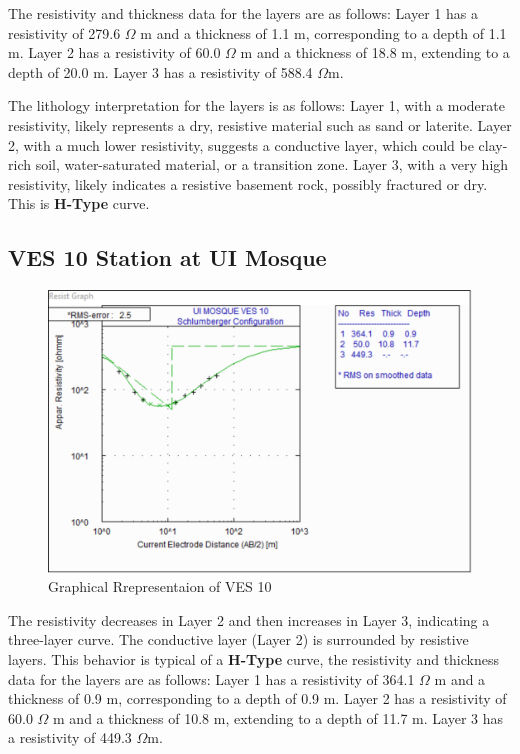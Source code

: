 \documentclass[12pt,a4paper]{report}
\begin{document}
The resistivity and thickness data for the layers are as follows: Layer 1 has a resistivity of 279.6 $\Omega$ m and a thickness of 1.1 m, corresponding to a depth of 1.1 m. Layer 2 has a resistivity of 60.0 $\Omega$ m and a thickness of 18.8 m, extending to a depth of 20.0 m. Layer 3 has a resistivity of 588.4 $\Omega$m.

The lithology interpretation for the layers is as follows: Layer 1, with a moderate resistivity, likely represents a dry, resistive material such as sand or laterite. Layer 2, with a much lower resistivity, suggests a conductive layer, which could be clay-rich soil, water-saturated material, or a transition zone. Layer 3, with a very high resistivity, likely indicates a resistive basement rock, possibly fractured or dry. This is \textbf{H-Type} curve.

\subsection{VES 10 Station at UI Mosque}

\begin{figure}[H]
    \centering
    \includegraphics[width=1.0\textwidth]{ui_ves10.png}
    \caption{Graphical Rrepresentaion of VES 10}
    \label{fig:VES_10_Curve}
\end{figure}

The resistivity decreases in Layer 2 and then increases in Layer 3, indicating a three-layer curve. The conductive layer (Layer 2) is surrounded by resistive layers. This behavior is typical of a \textbf{H-Type} curve, the resistivity and thickness data for the layers are as follows: Layer 1 has a resistivity of 364.1 $\Omega$ m and a thickness of 0.9 m, corresponding to a depth of 0.9 m. Layer 2 has a resistivity of 60.0 $\Omega$ m and a thickness of 10.8 m, extending to a depth of 11.7 m. Layer 3 has a resistivity of 449.3 $\Omega$m.
\end{document}
